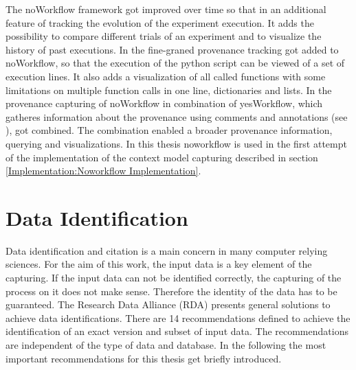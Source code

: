 \documentclass[draft,final]{vutinfth} %
\begin{document}
The noWorkflow framework got improved over time so that in \cite{Pimentel2016TrackingAA} an additional feature of tracking the evolution of the experiment execution. It adds the possibility to compare different trials of an experiment and to visualize the history of past executions. In \cite{Pimentel:2016:FPC:3090188.3090214} the fine-graned provenance tracking got added to noWorkflow, so that the execution of the python script can be viewed of a set of execution lines. It also adds a visualization of all called functions with some limitations on multiple function calls in one line, dictionaries and lists. In \cite{69bac1252a684629baa43b48e350068d} the provenance capturing of noWorkflow in combination of yesWorkflow, which gatheres information about the provenance using comments and annotations (see \cite{192094}), got combined. The combination enabled a broader provenance information, querying and visualizations. 
In this thesis noworkflow is used in the first attempt of the implementation of the context model capturing described in section \ref{Implementation:Noworkflow Implementation}.

\section{Data Identification}\label{Data Identification}
Data identification and citation is a main concern in many computer relying sciences. For the aim of this work, the input data is a key element of the capturing. If the input data can not be identified correctly, the capturing of the process on it does not make sense. Therefore the identity of the data has to be guaranteed. The Research Data Alliance (RDA) presents general solutions to achieve data identifications. There are 14 recommendations defined to achieve the identification of an exact version and subset of input data. The recommendations are independent of the type of data and database.  In the following the most important recommendations for this thesis get briefly introduced.\cite{rauber2016identification}
\end{document}
